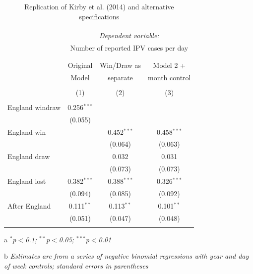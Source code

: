 \documentclass[12pt, letterpaper]{article}
\begin{document}
\newpage

\begin{table}
\centering
 \caption{Replication of Kirby et al. (2014) and alternative specifications}
   \label{kirbyrep}
 \begin{threeparttable}
\begin{tabular}{@{\extracolsep{5pt}}lccc} 
\\[-1.8ex]\hline 
\hline \\[-1.8ex] 
 & \multicolumn{3}{c}{\textit{Dependent variable:}} \\ 
  & \multicolumn{3}{c}{Number of reported IPV cases per day} \\ 
\cline{2-4} 
\\[-1.8ex] & \multicolumn{3}{c}{} \\ 
 & Original  & Win/Draw as & Model 2 + \\ 
  &  Model & separate & month control \\ 
\\[-1.8ex] & (1) & (2) & (3)\\ 
\hline \\[-1.8ex] 
 England windraw & 0.256$^{***}$ &  &  \\ 
  & (0.055) &  &  \\ 
  England win &  & 0.452$^{***}$ & 0.458$^{***}$ \\ 
  &  & (0.064) & (0.063) \\ 
  England draw &  & 0.032 & 0.031 \\ 
  &  & (0.073) & (0.073) \\ 
  England lost & 0.382$^{***}$ & 0.388$^{***}$ & 0.326$^{***}$ \\ 
  & (0.094) & (0.085) & (0.092) \\ 
  After England & 0.111$^{**}$ & 0.113$^{**}$ & 0.101$^{**}$ \\ 
  & (0.051) & (0.047) & (0.048) \\ 
 \hline \\[-1.8ex] 
\end{tabular} 
\begin{tablenotes}
      \item[a] \textit{$^{*}$p$<$0.1; $^{**}$p$<$0.05; $^{***}$p$<$0.01}
      \item[b] \textit{Estimates are from a series of negative binomial regressions  with year and day of week controls; standard errors in parentheses}
    \end{tablenotes}
\end{threeparttable} 
\end{table}
\end{document}
